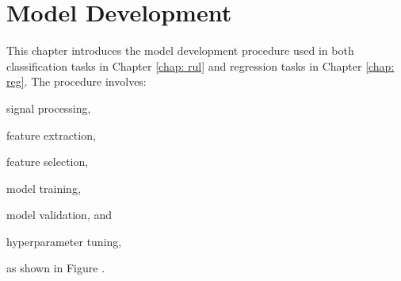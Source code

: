 \chapter{Model Development}
\label{chap: model}

This chapter introduces the model development procedure used in both classification tasks in Chapter \ref{chap: rul} and regression tasks in Chapter \ref{chap: reg}. The procedure involves:
\begin{enumerate*}[label=\itshape\alph*\upshape)]
    \item signal processing,
    \item feature extraction,
    \item feature selection,
    \item model training,
    \item model validation, and
    \item hyperparameter tuning,
\end{enumerate*}
as shown in Figure .